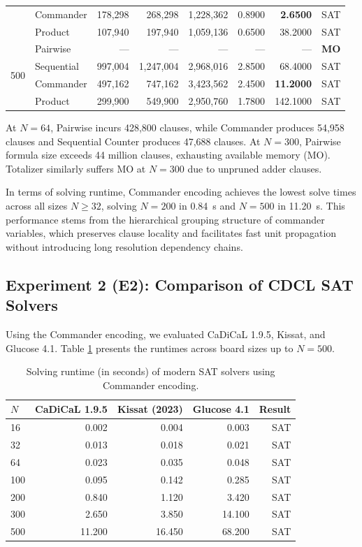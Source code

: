 \documentclass[a4paper,fleqn]{cas-sc}
\begin{document}
\begin{table}[!htbp]
\begin{tabular*}{\textwidth}{llrrrrrc}
 & Commander & 178,298 & 268,298 & 1,228,362 & 0.8900 & \textbf{2.6500} & SAT \\
 & Product & 107,940 & 197,940 & 1,059,136 & 0.6500 & 38.2000 & SAT \\
\midrule
\multirow{4}{*}{500} 
 & Pairwise & --- & --- & --- & --- & --- & \textbf{MO} \\
 & Sequential & 997,004 & 1,247,004 & 2,968,016 & 2.8500 & 68.4000 & SAT \\
 & Commander & 497,162 & 747,162 & 3,423,562 & 2.4500 & \textbf{11.2000} & SAT \\
 & Product & 299,900 & 549,900 & 2,950,760 & 1.7800 & 142.1000 & SAT \\
\bottomrule
\end{tabular*}
\end{table}

At $N = 64$, Pairwise incurs 428,800 clauses, while Commander produces 54,958 clauses and Sequential Counter produces 47,688 clauses. At $N = 300$, Pairwise formula size exceeds 44 million clauses, exhausting available memory (MO). Totalizer similarly suffers MO at $N = 300$ due to unpruned adder clauses.

In terms of solving runtime, Commander encoding achieves the lowest solve times across all sizes $N \ge 32$, solving $N = 200$ in 0.84~s and $N = 500$ in 11.20~s. This performance stems from the hierarchical grouping structure of commander variables, which preserves clause locality and facilitates fast unit propagation without introducing long resolution dependency chains.

\subsection{Experiment 2 (E2): Comparison of CDCL SAT Solvers}
Using the Commander encoding, we evaluated CaDiCaL 1.9.5, Kissat, and Glucose 4.1. Table \ref{tab:e2_solvers} presents the runtimes across board sizes up to $N = 500$.

\begin{table}[!htbp]
\centering
\caption{Solving runtime (in seconds) of modern SAT solvers using Commander encoding.}
\label{tab:e2_solvers}
\small
\begin{tabular}{lrrrr}
\toprule
$N$ & \textbf{CaDiCaL 1.9.5} & \textbf{Kissat (2023)} & \textbf{Glucose 4.1} & \textbf{Result} \\
\midrule
16  & 0.002 & 0.004 & 0.003 & SAT \\
32  & 0.013 & 0.018 & 0.021 & SAT \\
64  & 0.023 & 0.035 & 0.048 & SAT \\
100 & 0.095 & 0.142 & 0.285 & SAT \\
200 & 0.840 & 1.120 & 3.420 & SAT \\
300 & 2.650 & 3.850 & 14.100 & SAT \\
500 & 11.200 & 16.450 & 68.200 & SAT \\
\bottomrule
\end{tabular}
\end{table}
\end{document}
